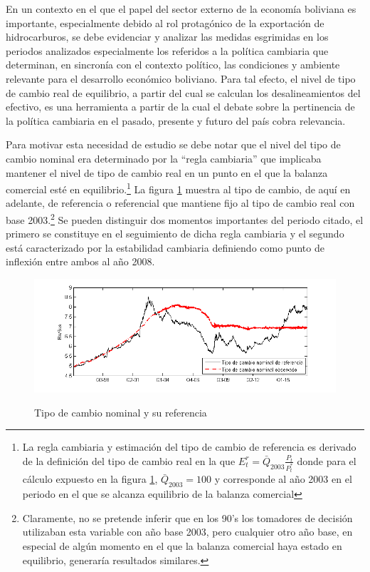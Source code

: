 \documentclass[12pt,letterpaper]{article}
\begin{document}
En un contexto en el que el papel del sector externo de la economía boliviana es importante, especialmente debido al rol protagónico de la exportación de hidrocarburos, se debe evidenciar y analizar las medidas esgrimidas en los periodos analizados especialmente los referidos a la política cambiaria que determinan, en sincronía con el contexto político, las condiciones y ambiente relevante para el desarrollo económico boliviano. Para tal efecto, el nivel de tipo de cambio real de equilibrio, a partir del cual se calculan los desalineamientos del efectivo, es una herramienta a partir de la cual el debate sobre la pertinencia de la política cambiaria en el pasado, presente y futuro del país cobra relevancia. 

Para motivar esta necesidad de estudio se debe notar que el nivel del tipo de cambio nominal era determinado por la ``regla cambiaria'' que implicaba mantener el nivel de tipo de cambio real en un punto en el que la balanza comercial esté en equilibrio.\footnote{La regla cambiaria y estimación del tipo de cambio de referencia es derivado de la definición del tipo de cambio real en la que $E_t^r=\bar{Q}_{2003}\frac{P_t}{P_t^*}$ donde para el cálculo expuesto en la figura \ref{tcn}, $\bar{Q}_{2003}=100$ y corresponde al año 2003 en el periodo en el que se alcanza equilibrio de la balanza comercial} La figura \ref{tcn} muestra al tipo de cambio, de aquí en adelante, de referencia o referencial que mantiene fijo al tipo de cambio real con base 2003.\footnote{Claramente, no se pretende inferir que en los 90's los tomadores de decisión utilizaban esta variable con año base 2003, pero cualquier otro año base, en especial de algún momento en el que la balanza comercial haya estado en equilibrio, generaría resultados similares.} Se pueden distinguir dos momentos importantes del periodo citado, el primero se constituye en el seguimiento de dicha regla cambiaria y el segundo está caracterizado por la estabilidad cambiaria definiendo como punto de inflexión entre ambos al año 2008. 

\begin{figure}
\centering
\caption{Tipo de cambio nominal y su referencia}\label{variables}
        \includegraphics[width=\textwidth]{tcn}
        \label{tcn}
\end{figure}
\end{document}
